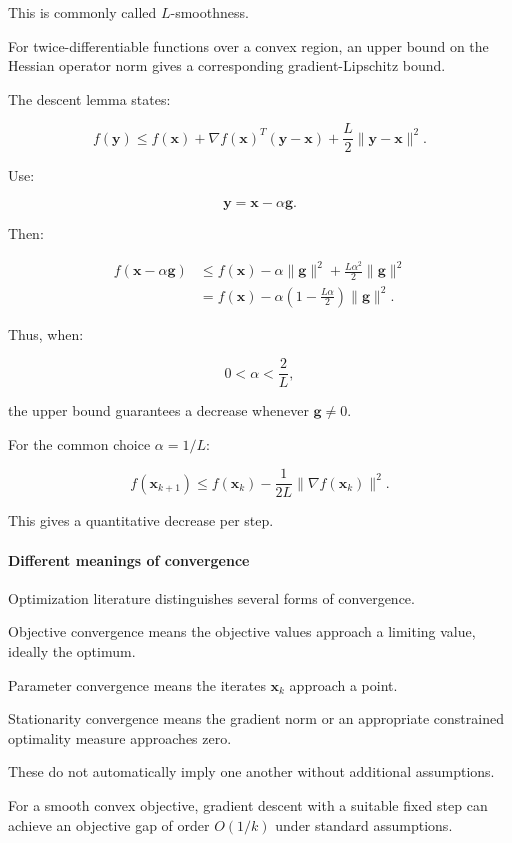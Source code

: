 This is commonly called \(L\)-smoothness.

For twice-differentiable functions over a convex region, an upper bound on the Hessian operator norm gives a corresponding gradient-Lipschitz bound.

The descent lemma states:

\[
f(\mathbf y) \le f(\mathbf x)+ \nabla f(\mathbf x)^T(\mathbf y-\mathbf x) +\frac L2\|\mathbf y-\mathbf x\|^2.
\]

Use:

\[
\mathbf y=\mathbf x-\alpha\mathbf g.
\]

Then:

\[
\begin{aligned} f(\mathbf x-\alpha\mathbf g) &\le f(\mathbf x) -\alpha\|\mathbf g\|^2 +\frac{L\alpha^2}{2}\|\mathbf g\|^2\\ &=f(\mathbf x) -\alpha\left(1-\frac{L\alpha}{2}\right)\|\mathbf g\|^2. \end{aligned}
\]

Thus, when:

\[
0<\alpha<\frac2L,
\]

the upper bound guarantees a decrease whenever \(\mathbf g\ne0\).

For the common choice \(\alpha=1/L\):

\[
\boxed{ f(\mathbf x_{k+1}) \le f(\mathbf x_k)- \frac1{2L}\|\nabla f(\mathbf x_k)\|^2 }.
\]

This gives a quantitative decrease per step.

\paragraph{Different meanings of convergence}\label{02-foundations-ii-ch026-different-meanings-of-convergence}

Optimization literature distinguishes several forms of convergence.

Objective convergence means the objective values approach a limiting value, ideally the optimum.

Parameter convergence means the iterates \(\mathbf x_k\) approach a point.

Stationarity convergence means the gradient norm or an appropriate constrained optimality measure approaches zero.

These do not automatically imply one another without additional assumptions.

For a smooth convex objective, gradient descent with a suitable fixed step can achieve an objective gap of order \(O(1/k)\) under standard assumptions.

